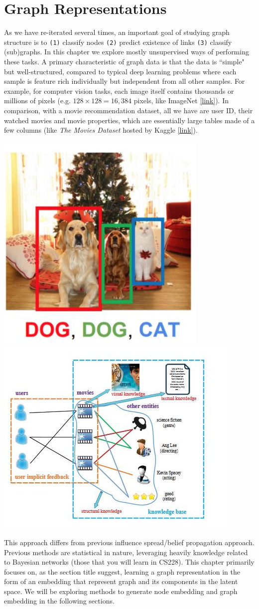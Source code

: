 \section{Graph Representations}\label{ss_4_graph_repr}

As we have re-iterated several times, an important goal of studying graph structure is to \texttt{(1)} classify nodes \texttt{(2)} predict existence of links \texttt{(3)} classify (sub)graphs. In this chapter we explore mostly unsupervised ways of performing these tasks. A primary characteristic of graph data is that the data is ``simple" but well-structured, compared to typical deep learning problems where each sample is feature rich individually but independent from all other samples. For example, for computer vision tasks, each image itself contains thousands or millions of pixels (e.g. $128 \times 128=16,384$ pixels, like ImageNet \href{http://image-net.org/explore}{[link]}). In comparison, with a movie recommendation dataset, all we have are user ID, their watched movies and movie properties, which are essentially large tables made of a few columns (like \textit{The Movies Dataset} hosted by Kaggle \href{https://www.kaggle.com/rounakbanik/the-movies-dataset}{[link]}). 

{
\centering
\includegraphics[width=0.3\linewidth]{notes/img/n4_image_classification.JPG} 
\hspace{2cm}
\includegraphics[width=0.4\linewidth]{notes/img/n1_movies.jpg} \par
}

This approach differs from previous influence spread/belief propagation approach. Previous methods are statistical in nature, leveraging heavily knowledge related to Bayesian networks (those that you will learn in CS228). This chapter primarily focuses on, as the section title suggest, learning a graph representation in the form of an embedding that represent graph and its components in the latent space. We will be exploring methods to generate node embedding and graph embedding in the following sections.

